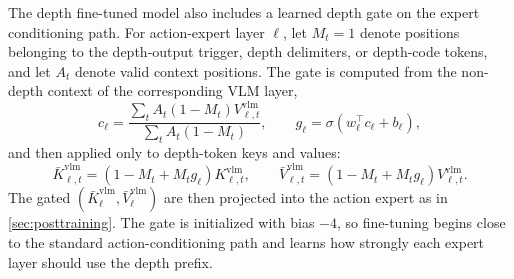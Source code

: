 The \libero depth fine-tuned model also includes a learned depth gate on the
expert conditioning path. For action-expert layer \(\ell\), let \(M_t=1\)
denote positions belonging to the depth-output trigger, depth delimiters, or
depth-code tokens, and let \(A_t\) denote valid context positions. The gate is
computed from the non-depth context of the corresponding VLM layer,
\begin{equation}
    c_\ell
    =
    \frac{
        \sum_t A_t(1-M_t)V^{\mathrm{vlm}}_{\ell,t}
    }{
        \sum_t A_t(1-M_t)
    },
    \qquad
    g_\ell
    =
    \sigma(w_\ell^\top c_\ell + b_\ell),
\end{equation}
and then applied only to depth-token keys and values:
\begin{equation}
    \bar{K}^{\mathrm{vlm}}_{\ell,t}
    =
    \left(1-M_t+M_t g_\ell\right)K^{\mathrm{vlm}}_{\ell,t},
    \qquad
    \bar{V}^{\mathrm{vlm}}_{\ell,t}
    =
    \left(1-M_t+M_t g_\ell\right)V^{\mathrm{vlm}}_{\ell,t}.
\end{equation}
The gated \((\bar{K}^{\mathrm{vlm}}_{\ell},\bar{V}^{\mathrm{vlm}}_{\ell})\)
are then projected into the action expert as in \autoref{sec:posttraining}.
The gate is initialized with bias \(-4\), so fine-tuning begins close to the
standard action-conditioning path and learns how strongly each expert layer
should use the depth prefix.
